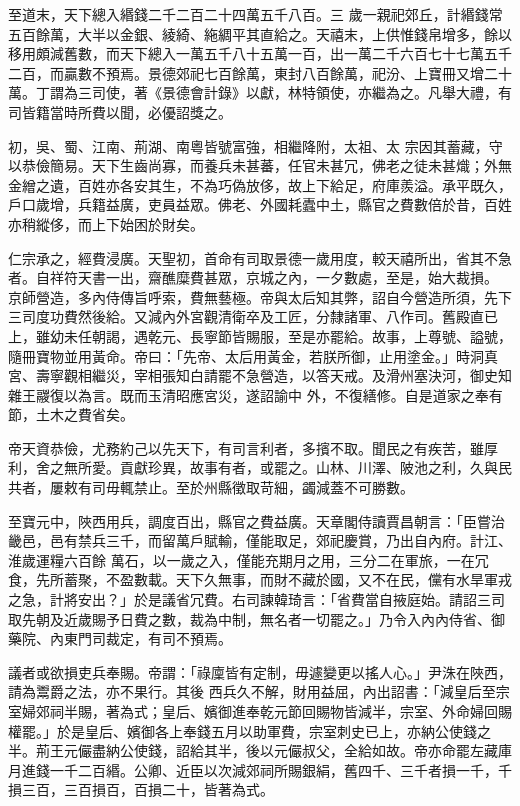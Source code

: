 \begin{pinyinscope}
 至道末，天下總入緡錢二千二百二十四萬五千八百。三
 歲一親祀郊丘，計緡錢常五百餘萬，大半以金銀、綾綺、絁綢平其直給之。天禧末，上供惟錢帛增多，餘以移用頗減舊數，而天下總入一萬五千八十五萬一百，出一萬二千六百七十七萬五千二百，而贏數不預焉。景德郊祀七百餘萬，東封八百餘萬，祀汾、上寶冊又增二十萬。丁謂為三司使，著《景德會計錄》以獻，林特領使，亦繼為之。凡舉大禮，有司皆籍當時所費以聞，必優詔獎之。



 初，吳、蜀、江南、荊湖、南粵皆號富強，相繼降附，太祖、太
 宗因其蓄藏，守以恭儉簡易。天下生齒尚寡，而養兵未甚蕃，任官未甚冗，佛老之徒未甚熾；外無金繒之遺，百姓亦各安其生，不為巧偽放侈，故上下給足，府庫羨溢。承平既久，戶口歲增，兵籍益廣，吏員益眾。佛老、外國耗蠹中土，縣官之費數倍於昔，百姓亦稍縱侈，而上下始困於財矣。



 仁宗承之，經費浸廣。天聖初，首命有司取景德一歲用度，較天禧所出，省其不急者。自祥符天書一出，齋醮糜費甚眾，京城之內，一夕數處，至是，始大裁損。
 京師營造，多內侍傳旨呼索，費無藝極。帝與太后知其弊，詔自今營造所須，先下三司度功費然後給。又減內外宮觀清衛卒及工匠，分隸諸軍、八作司。舊殿直已上，雖幼未任朝謁，遇乾元、長寧節皆賜服，至是亦罷給。故事，上尊號、謚號，隨冊寶物並用黃命。帝曰：「先帝、太后用黃金，若朕所御，止用塗金。」時洞真宮、壽寧觀相繼災，宰相張知白請罷不急營造，以答天戒。及滑州塞決河，御史知雜王鬷復以為言。既而玉清昭應宮災，遂詔諭中
 外，不復繕修。自是道家之奉有節，土木之費省矣。



 帝天資恭儉，尤務約己以先天下，有司言利者，多擯不取。聞民之有疾苦，雖厚利，舍之無所愛。貢獻珍異，故事有者，或罷之。山林、川澤、陂池之利，久與民共者，屢敕有司毋輒禁止。至於州縣徵取苛細，蠲減蓋不可勝數。



 至寶元中，陜西用兵，調度百出，縣官之費益廣。天章閣侍讀賈昌朝言：「臣嘗治畿邑，邑有禁兵三千，而留萬戶賦輸，僅能取足，郊祀慶賞，乃出自內府。計江、淮歲運糧六百餘
 萬石，以一歲之入，僅能充期月之用，三分二在軍旅，一在冗食，先所蓄聚，不盈數載。天下久無事，而財不藏於國，又不在民，儻有水旱軍戎之急，計將安出？」於是議省冗費。右司諫韓琦言：「省費當自掖庭始。請詔三司取先朝及近歲賜予日費之數，裁為中制，無名者一切罷之。」乃令入內內侍省、御藥院、內東門司裁定，有司不預焉。



 議者或欲損吏兵奉賜。帝謂：「祿廩皆有定制，毋遽變更以搖人心。」尹洙在陜西，請為鬻爵之法，亦不果行。其後
 西兵久不解，財用益屈，內出詔書：「減皇后至宗室婦郊祠半賜，著為式；皇后、嬪御進奉乾元節回賜物皆減半，宗室、外命婦回賜權罷。」於是皇后、嬪御各上奉錢五月以助軍費，宗室刺史已上，亦納公使錢之半。荊王元儼盡納公使錢，詔給其半，後以元儼叔父，全給如故。帝亦命罷左藏庫月進錢一千二百緡。公卿、近臣以次減郊祠所賜銀絹，舊四千、三千者損一千，千損三百，三百損百，百損二十，皆著為式。




\end{pinyinscope}
